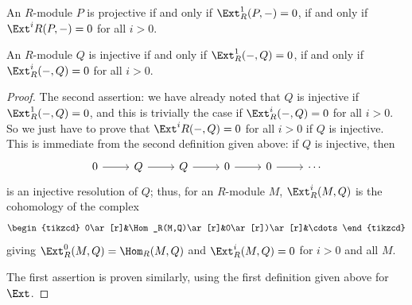 \begin{proposition}\label{Ext proj inj}
An $R$-module $P$ is projective if and only if $\Ext^1_R(P,-)=0$, if and only if $\Ext^iR(P,-)=0$ for all $i>0$.\par
An $R$-module $Q$ is injective if and only if $\Ext^1_R(-,Q)=0$, if and only if $\Ext^i_R(-,Q)=0$ for all $i>0$.
\end{proposition}
\begin{proof}
The second assertion: we have already noted that $Q$ is injective if $\Ext^1_R(-,Q)=0$, and this is trivially the case if $\Ext^i_R(-,Q)=0$ for all $i>0$. So we just have to prove that $\Ext^iR(-,Q)=0$ for all $i>0$ if $Q$ is injective. This is immediate from the second definition given above: if $Q$ is injective, then
\[\begin{tikzcd}
0\ar[r]&Q\ar[r]&Q\ar[r]&0\ar[r]&0\ar[r]&\cdots
\end{tikzcd}\]
is an injective resolution of $Q$; thus, for an $R$-module $M$, $\Ext^i_R(M,Q)$ is the cohomology
of the complex
\[\begin{tikzcd}
0\ar[r]&\Hom_R(M,Q)\ar[r]&0\ar[r])\ar[r]&\cdots
\end{tikzcd}\]
giving $\Ext^0_R(M,Q)=\Hom_R(M,Q)$ and $\Ext^i_R(M,Q)=0$ for $i>0$ and all $M$.\par
The first assertion is proven similarly, using the first definition given above for $\Ext$.
\end{proof}
